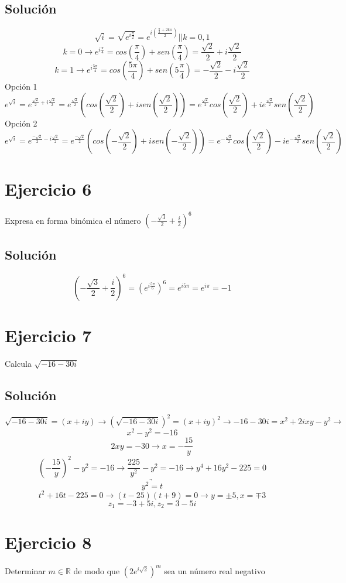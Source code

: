 \documentclass[fleqn]{article}
\begin{document}
	\subsection{Solución}
	\[
	\sqrt{i} = \sqrt{e^{i\frac{\pi}{2}}} = e^{i(\frac{\frac{\pi}{2} + 2k\pi}{2})} || k = 0,1
	\]
	\[
	k = 0 \rightarrow e^{i\frac{\pi}{4}} = cos(\frac{\pi}{4}) + sen(\frac{\pi}{4}) = \frac{\sqrt{2}}{2} + i\frac{\sqrt{2}}{2}
	\]
	\[
	k = 1 \rightarrow e^{i\frac{5\pi}{4}} = cos(\frac{5\pi}{4}) + sen(5\frac{\pi}{4}) = -\frac{\sqrt{2}}{2} - i\frac{\sqrt{2}}{2}
	\]
	Opción 1
	\[
	e^{\sqrt{i}} = e^{\frac{\sqrt{2}}{2} + i\frac{\sqrt{2}}{2}} = e^{\frac{\sqrt{2}}{2}}(cos(\frac{\sqrt{2}}{2}) + i sen(\frac{\sqrt{2}}{2})) = \boxed{e^{\frac{\sqrt{2}}{2}}cos(\frac{\sqrt{2}}{2}) + ie^{\frac{\sqrt{2}}{2}}sen(\frac{\sqrt{2}}{2})}
	\]
	Opción 2
	\[
	e^{\sqrt{i}} = e^{\frac{-\sqrt{2}}{2} - i\frac{\sqrt{2}}{2}} = e^{\frac{-\sqrt{2}}{2}}(cos(-\frac{\sqrt{2}}{2}) + i sen(-\frac{\sqrt{2}}{2})) = \boxed{e^{-\frac{\sqrt{2}}{2}}cos(\frac{\sqrt{2}}{2}) - ie^{-\frac{\sqrt{2}}{2}}sen(\frac{\sqrt{2}}{2})}
	\]
	\section{Ejercicio 6}
	Expresa en forma binómica el número $(-\frac{\sqrt{3}}{2} + \frac{i}{2})^{6}$
	\subsection{Solución}
	\[
	(-\frac{\sqrt{3}}{2} + \frac{i}{2})^{6} = (e^{i\frac{5\pi}{6}})^{6} = e^{i5\pi} = e^{i\pi} = \boxed{-1}
	\]
	\section{Ejercicio 7}
	Calcula $\sqrt{-16-30i}$
	\subsection{Solución}
	\[
	\sqrt{-16-30i} = (x+iy) \rightarrow (\sqrt{-16-30i})^{2} = (x+iy)^{2} \rightarrow -16-30i = x^{2} + 2ixy - y^{2} \rightarrow
	\]
	\[
	x^{2} - y^{2} = -16
	\]
	\[
	2xy = -30 \rightarrow x = -\frac{15}{y}
	\]
	\[
	(-\frac{15}{y})^{2} - y^{2} = -16 \rightarrow \frac{225}{y^{2}} - y^{2} = -16 \rightarrow y^{4} +16y^{2} - 225 = 0
	\]
	\[
	\underrightarrow{y^{2} = t}
	\]
	\[
	t^{2} +16t -225 = 0 \rightarrow (t-25)(t+9) = 0 \rightarrow y=\pm5, x=\mp3
	\]
	\[
	\boxed{z_1 = -3 + 5i, z_2 = 3 -5i}
	\]
	\section{Ejercicio 8}
	Determinar $m \in \mathbb{R}$ de modo que $(2e^{i\sqrt{2}})^{m}$ sea un número real negativo
\end{document}
